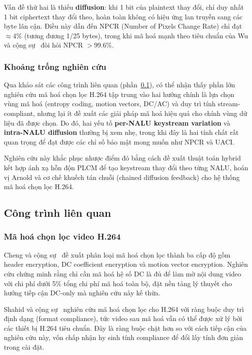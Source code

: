 Vấn đề thứ hai là thiếu \textbf{diffusion}: khi 1 bit của plaintext thay đổi, chỉ duy nhất 1 bit ciphertext thay đổi theo, hoàn toàn không có hiệu ứng lan truyền sang các byte lân cận. Điều này dẫn đến NPCR (Number of Pixels Change Rate) chỉ đạt $\approx 4\%$ (tương đương 1/25 bytes), trong khi mã hoá mạnh theo tiêu chuẩn của Wu và cộng sự~\cite{wu_npcr} đòi hỏi NPCR $> 99.6\%$.

\subsubsection{Khoảng trống nghiên cứu}

Qua khảo sát các công trình liên quan (phần~\ref{subsec:related_work}), có thể nhận thấy phần lớn nghiên cứu mã hoá chọn lọc H.264 tập trung vào hai hướng chính là lựa chọn vùng mã hoá (entropy coding, motion vectors, DC/AC) và duy trì tính stream-compliant, nhưng lại ít đề xuất các giải pháp mã hoá hiệu quả cho chính vùng dữ liệu đã được chọn. Do đó, hai yếu tố \textbf{per-NALU keystream variation} và \textbf{intra-NALU diffusion} thường bị xem nhẹ, trong khi đây là hai tính chất rất quan trọng để đạt được các chỉ số bảo mật mong muốn như NPCR và UACI.

Nghiên cứu này khắc phục nhược điểm đó bằng cách đề xuất thuật toán hybrid kết hợp ánh xạ hỗn độn PLCM để tạo keystream thay đổi theo từng NALU, hoán vị Arnold và cơ chế khuếch tán chuỗi (chained diffusion feedback) cho hệ thống mã hoá chọn lọc H.264.

\subsection{Công trình liên quan}
\label{subsec:related_work}

\subsubsection{Mã hoá chọn lọc video H.264}

Cheng và cộng sự~\cite{cheng_selective} đề xuất phân loại mã hoá chọn lọc thành ba cấp độ gồm header encryption, DC coefficient encryption và motion vector encryption. Nghiên cứu chứng minh rằng chỉ cần mã hoá hệ số DC là đủ để làm mờ nội dung video với chi phí dưới 5\% tổng chi phí mã hoá toàn bộ, đặt nền tảng lý thuyết cho hướng tiếp cận DC-only mà nghiên cứu này kế thừa.

Shahid và cộng sự~\cite{shahid_selective} nghiên cứu mã hoá chọn lọc cho H.264 với ràng buộc duy trì định dạng (format compliance), tức video sau mã hoá vẫn có thể được xử lý bởi các thiết bị H.264 tiêu chuẩn. Đây là ràng buộc chặt hơn so với cách tiếp cận của nghiên cứu này, vốn chấp nhận hy sinh tính compliance để đổi lấy tính đơn giản trong cài đặt.

